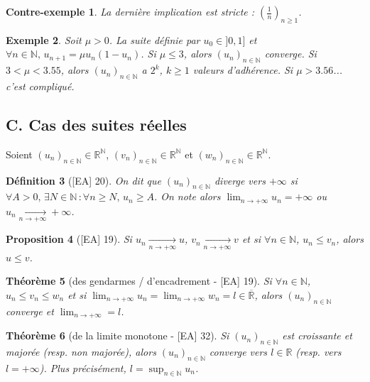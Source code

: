\documentclass[10pt, a4paper, parskip=full, twoside, twocolumn]{report}
\newtheorem{definition}{Définition}
\newtheorem{theorem}[definition]{Théorème}
\newtheorem{proposition}[definition]{Proposition}
\newtheorem{example}[definition]{Exemple}
\newtheorem{cexample}[definition]{Contre-exemple}
\newcommand{\IN}{\mathbb{N}}
\newcommand{\IR}{\mathbb{R}}
\begin{document}
\begin{cexample}
	La dernière implication est stricte : $\left(\frac{1}{n}\right)_{n\geq 1}$.
\end{cexample}

\begin{example}
	Soit $\mu > 0$. La suite définie par $u_0\in]0,1]$ et $\forall n\in\IN,\, u_{n+1} = \mu u_n(1-u_n)$.
	Si $\mu \leq 3$, alors $\left(u_n\right)_{n\in\IN}$ converge. Si $3 < \mu < 3.55$, alors $\left(u_n\right)_{n\in\IN}$ a $2^k$, $k\geq 1$ valeurs d'adhérence. Si $\mu > 3.56$... c'est compliqué.
\end{example}

\subsection*{C. Cas des suites réelles}

\textcolor{paragraphtext}{Soient $\left(u_n\right)_{n\in\IN}\in\IR^{\IN}$, $\left(v_n\right)_{n\in\IN}\in\IR^{\IN}$ et $\left(w_n\right)_{n\in\IN}\in\IR^{\IN}$.}

\begin{definition}[\textnormal{[EA] 20}]
	On dit que $\left(u_n\right)_{n\in\IN}$ \emph{diverge vers $+\infty$} si $\forall A > 0,\,\exists N\in\IN\,\colon \forall n\geq N,\, u_n \geq A$.
	On note alors $\displaystyle{\lim_{n\to +\infty} u_n = +\infty}$ ou $u_n\xrightarrow[n\to +\infty]{}+\infty$.
\end{definition}

\begin{proposition}[\textnormal{[EA] 19}]
	Si $u_n\xrightarrow[n\to +\infty]{} u$, $v_n\xrightarrow[n\to +\infty]{} v$ et si $\forall n\in \IN$, $u_n\leq v_n$, alors $u\leq v$.
\end{proposition}

\begin{theorem}[des gendarmes / d'encadrement - \textnormal{[EA] 19}]
	Si $\forall n\in\IN$, $u_n\leq v_n\leq w_n$ et si $\displaystyle{\lim_{n\to +\infty} u_n = \lim_{n\to +\infty} w_n = l \in \overline{\IR}}$, 
	alors $\left(u_n\right)_{n\in\IN}$ converge et $\displaystyle{\lim_{n\to +\infty}} = l$.
\end{theorem}

\begin{theorem}[de la limite monotone - \textnormal{[EA] 32}]
	Si $\left(u_n\right)_{n\in\IN}$ est croissante et majorée (resp. non majorée), alors $\left(u_n\right)_{n\in\IN}$ converge vers $l\in\IR$ (resp. vers $l = +\infty$).
	Plus précisément, $\displaystyle{l = \sup_{n\in\IN} u_n}$.
\end{theorem}
\end{document}
